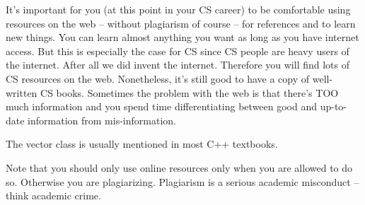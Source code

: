 It's important for you (at this point in your CS career) to be 
comfortable using resources on the web – without plagiarism of 
course – for references and to learn new things. You can learn 
almost anything you want as long as you have internet access. 
But this is especially the case for CS since CS people are heavy 
users of the internet. After all we did invent the internet. 
Therefore you will find lots of CS resources on the web. Nonetheless, 
it's still good to have a copy of well-written CS books. Sometimes 
the problem with the web is that there's TOO much information and 
you spend time differentiating between good and up-to-date 
information from mis-information.

The vector class is usually mentioned in most C++ textbooks.

Note that you should only use online resources only when you
are allowed to do so.
Otherwise you are plagiarizing.
Plagiarism is a serious academic misconduct -- think academic crime.
